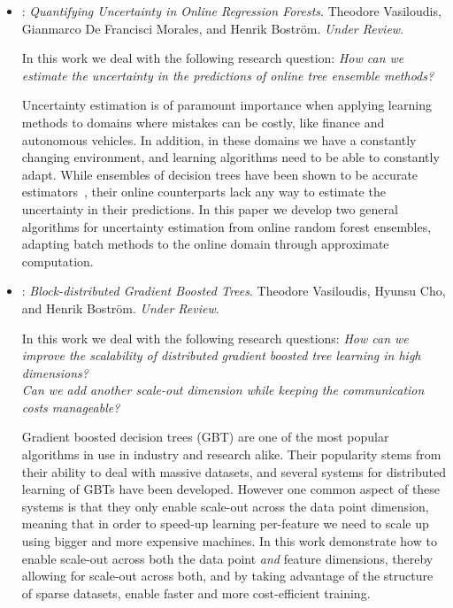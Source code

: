 \begin{itemize}
	\item \textbf{\uncertaintrees}: \emph{Quantifying Uncertainty in Online Regression Forests}. Theodore Vasiloudis, Gianmarco De Francisci Morales, and Henrik Bostr\"{o}m. \emph{Under Review}.

	In this work we deal with the following research question:
	\emph{How can we estimate the uncertainty in the predictions of online tree
	ensemble methods?}

	Uncertainty estimation is of paramount importance when applying learning methods
	to domains where mistakes can be costly, like finance and autonomous vehicles.
	In addition, in these domains we have a constantly changing environment,
	and learning algorithms need to be able to constantly adapt. While ensembles
	of decision trees have been shown to be accurate estimators~\cite{hundreds-classifiers}, their online
	counterparts lack any way to estimate the uncertainty in their predictions.
	In this paper we develop two general algorithms for uncertainty estimation
	from online random forest ensembles, adapting batch methods to the online
	domain through approximate computation.


	\item \textbf{\blockgbt}: \emph{Block-distributed Gradient Boosted Trees}. Theodore Vasiloudis, Hyunsu Cho, and Henrik Bostr\"{o}m. \emph{Under Review}.


	In this work we deal with the following research questions:
	\emph{How can we improve the scalability of distributed gradient boosted tree learning
	in high dimensions?\\
	Can we add another scale-out dimension while keeping the
	communication costs manageable?}

	Gradient boosted decision trees (GBT) are one of the most popular algorithms in
	use in industry and research alike. Their popularity stems from their ability
	to deal with massive datasets, and several systems for distributed learning
	of GBTs have been developed. However one common aspect of these systems is that
	they only enable scale-out across the data point dimension, meaning that in
	order to speed-up learning per-feature we need to scale up using bigger and more
	expensive machines. In this work demonstrate how to enable scale-out across
	both the data point \emph{and} feature dimensions, thereby allowing for scale-out
	across both, and by taking advantage of the structure of sparse datasets,
	enable faster and more cost-efficient training.
\end{itemize}

